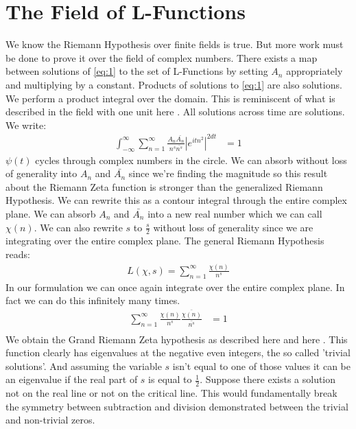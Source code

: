 \documentclass[10pt, oneside]{article}
\begin{document}
  \section{The Field of L-Functions}
  We know the Riemann Hypothesis over finite fields is true. \cite{milne2015riemannhypothesisfinitefields} \cite{youtube:f1} But more work must be done to prove it over the field of complex numbers.
  There exists a map between solutions of \ref{eq:1} to the set of L-Functions by setting $A_n$ appropriately and multiplying by a constant.
  Products of solutions to \ref{eq:1} are also solutions. We perform a product integral over the domain.
  This is reminiscent of what is described in the field with one unit here \cite{youtube:f1}. All solutions across time are solutions. We write:
  \begin{align*}
    \int_{-\infty}^{\infty}\sum_{n=1}^{\infty} \frac{A_n \bar{A_n}}{n^{s}\bar{n^s}} |e^{i t n^2} |^{2dt} &=  1
  \end{align*}
  $\psi(t)$ cycles through complex numbers in the circle. We can absorb without loss of generality into $A_n$ and $\bar{A_n}$ since we're finding the magnitude so this result about the Riemann Zeta function is stronger than the generalized Riemann Hypothesis.
  We can rewrite this as a contour integral through the entire complex plane.
  We can absorb $A_n$ and $\bar{A_n}$ into a new real number which we can call $\chi (n)$. We can also rewrite $s$ to $\frac{s}{2}$ without loss of generality since we are integrating over the entire complex plane. The general Riemann Hypothesis reads: \cite{Davenport2000}
  \begin{align}
      L(\chi,s) = \sum_{n=1}^{\infty} \frac{\chi(n)}{n^s} \label{general}
  \end{align}
  In our formulation we can once again integrate over the entire complex plane. In fact we can do this infinitely many times.
  \begin{align}
      \sum_{n=1}^{\infty} \frac{\chi(n)}{n^s} \frac{\bar{\chi(n)}}{\bar{n^s}} & = 1 \\
  \end{align}
  We obtain the Grand Riemann Zeta hypothesis as described here \cite{youtube:f1} and here \cite{Davenport2000}. This function clearly has eigenvalues at the negative even integers, the so called 'trivial solutions'. And assuming the variable $s$ isn't equal to one of those values it can be an eigenvalue if the real part of $s$ is equal to $\frac{1}{2}$.
  Suppose there exists a solution not on the real line or not on the critical line. This would fundamentally break the symmetry between subtraction and division demonstrated between the trivial and non-trivial zeros.
\end{document}
